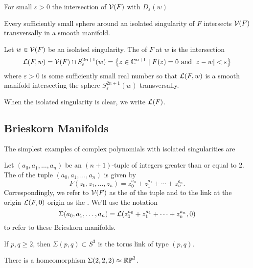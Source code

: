 \begin{theorem}
  For small $\varepsilon>0$ the intersection of $\mathcal{V}(F)$ with $D_\varepsilon(w)$
\end{theorem}

\begin{proposition}
	Every sufficiently small sphere around an isolated singularity of $F$ intersects $\mathcal{V}(F)$ transversally in a smooth manifold.
\end{proposition}

\begin{definition}
	Let $w\in \mathcal{V}(F)$ be an isolated singularity. The  of $F$ at $w$ is the intersection
	\[
		\mathcal{L}(F, w) = \mathcal{V}(F) \cap S^{2n+1}_\varepsilon(w) = \left\{ z\in \mathbb{C}^{n+1} \mid F(z)=0\textrm{ and } |z-w|<\varepsilon\right\}
	\]
	where $\varepsilon > 0$ is some sufficiently small real number so that $\mathcal{L}(F,w)$ is a smooth manifold intersecting the sphere $S^{2n+1}_\varepsilon(w)$ transversally.
\end{definition}

When the isolated singularity is clear, we write $\mathcal{L}(F)$.

\subsection{Brieskorn Manifolds}
The simplest examples of complex polynomials with isolated singularities are 

\begin{definition}
	Let $(a_0,a_1,\ldots, a_n)$ be an $(n+1)$-tuple of integers greater than or equal to $2$. The  of the tuple $(a_0,a_1,\ldots, a_n)$ is given by
	\[
		F(z_0,z_1,\ldots, z_n) = z_0^{a_0} + z_1^{a_1} +\cdots + z_n^{a_n}.
	\]
	Correspondingly, we refer to $\mathcal{V}(F)$ as the  of the tuple and to the link at the origin $\mathcal{L}(F,0)$ origin as the . We'll use the notation
	\[
		\Sigma(a_0,a_1,\ldots, a_n) =\mathcal{L}(z_0^{a_0}+z_1^{a_1}+\cdots+z_n^{a_n}, 0)
	\]
	to refer to these Brieskorn manifolds.
\end{definition}


\begin{proposition}
	If $p,q\geq 2$, then $\Sigma(p,q)\subset S^3$ is the torus link of type $(p,q)$.
\end{proposition}

\begin{proposition}
	There is a homeomorphism $\Sigma(2,2,2)\approx \mathbb{RP}^3$.
\end{proposition}


